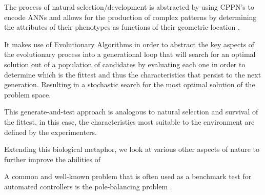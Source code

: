 The process of natural selection/development is abstracted by using CPPN's to encode ANNs and allows for the production of complex patterns by determining the attributes of their phenotypes as functions of their geometric location \cite{clune2011performance}.



It makes use of Evolutionary Algorithms in order to abstract the key aspects of the evolutionary process into a generational loop that will search for an optimal solution out of a population of candidates by evaluating each one in order to determine which is the fittest and thus the characteristics that persist to the next generation. Resulting in a stochastic search for the most optimal solution of the problem space.

This generate-and-test approach is analogous to natural selection and survival of the fittest, in this case, the characteristics most suitable to the environment are defined by the experimenters.

Extending this biological metaphor, we look at various other aspects of nature to further improve the abilities of 



A common and well-known problem that is often used as a benchmark test for automated controllers is the pole-balancing problem \cite{Stanley2004}.








